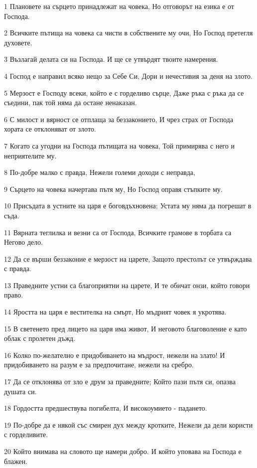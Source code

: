 \par 1 Плановете на сърцето принадлежат на човека, Но отговорът на езика е от Господа.
\par 2 Всичките пътища на човека са чисти в собствените му очи, Но Господ претегля духовете.
\par 3 Възлагай делата си на Господа. И ще се утвърдят твоите намерения.
\par 4 Господ е направил всяко нещо за Себе Си, Дори и нечестивия за деня на злото.
\par 5 Мерзост е Господу всеки, който е с горделиво сърце, Даже ръка с ръка да се съедини, пак той няма да остане ненаказан.
\par 6 С милост и вярност се отплаща за беззаконието, И чрез страх от Господа хората се отклоняват от злото.
\par 7 Когато са угодни на Господа пътищата на човека, Той примирява с него и неприятелите му.
\par 8 По-добре малко с правда, Нежели големи доходи с неправда,
\par 9 Сърцето на човека начертава пътя му, Но Господ оправя стъпките му.
\par 10 Присъдата в устните на царя е боговдъхновена; Устата му няма да погрешат в съда.
\par 11 Вярната теглилка и везни са от Господа, Всичките грамове в торбата са Негово дело.
\par 12 Да се върши беззаконие е мерзост на царете, Защото престолът се утвърждава с правда.
\par 13 Праведните устни са благоприятни на царете, И те обичат онзи, който говори право.
\par 14 Яростта на царя е вестителка на смърт, Но мъдрият човек я укротява.
\par 15 В светенето пред лицето на царя има живот, И неговото благоволение е като облак с пролетен дъжд.
\par 16 Колко по-желателно е придобиването на мъдрост, нежели на злато! И придобиването на разум е за предпочитане, нежели на сребро.
\par 17 Да се отклонява от зло е друм за праведните; Който пази пътя си, опазва душата си.
\par 18 Гордостта предшествува погибелта, И високоумието - падането.
\par 19 По-добре да е някой със смирен дух между кротките, Нежели да дели користи с горделивите.
\par 20 Който внимава на словото ще намери добро. И който уповава на Господа е блажен.
